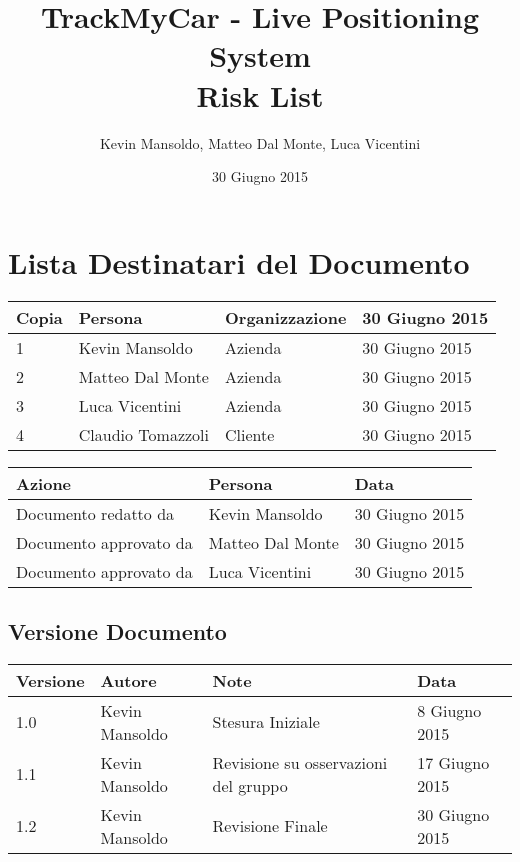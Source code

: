 \documentclass[a4paper,12pt]{article}
\begin{document}
\title{\textbf{TrackMyCar - Live Positioning System} \\ Risk List}

\author{Kevin Mansoldo, Matteo Dal Monte, Luca Vicentini}
\date{30 Giugno 2015}
\maketitle
\pagebreak

\tableofcontents
\pagebreak

\section{Lista Destinatari del Documento}

\begin{table*}[ht]
\begin{center}
\begin{tabular}{p{1cm} p{4.5cm} p{3.5cm} p{3.5cm}}
\rowcolor{Ash}
\hline
Copia & Persona & Organizzazione & 30 Giugno 2015 \\ \hline
1 & Kevin Mansoldo & Azienda & 30 Giugno 2015 \\ 
2 & Matteo Dal Monte & Azienda & 30 Giugno 2015 \\ 
3 & Luca Vicentini & Azienda & 30 Giugno 2015 \\ 
4 & Claudio Tomazzoli & Cliente & 30 Giugno 2015 \\ \hline
\end{tabular}
\end{center}


\begin{center}
\begin{tabular}{p{6cm} p{3.5cm} p{3.5cm}}
\rowcolor{Ash}
\hline
Azione & Persona & Data \\ \hline
Documento redatto da & Kevin Mansoldo & 30 Giugno 2015 \\ 
Documento approvato da & Matteo Dal Monte & 30 Giugno 2015 \\ 
Documento approvato da & Luca Vicentini & 30 Giugno 2015 \\ \hline
\end{tabular}
\end{center}
\end{table*}

\subsection{Versione Documento}
\begin{table*}[ht]
\begin{center}
\begin{tabular}{p{1cm} p{3cm} p{5cm} p{3.5cm}}
\rowcolor{Ash}
\hline
Versione & Autore & Note & Data \\ \hline
1.0 & Kevin Mansoldo & Stesura Iniziale & 8 Giugno 2015 \\ 
1.1 & Kevin Mansoldo & Revisione su osservazioni del gruppo & 17 Giugno 2015 \\ 
1.2 & Kevin Mansoldo & Revisione Finale & 30 Giugno 2015 \\ \hline
\end{tabular}
\end{center}
\end{table*}
\end{document}
